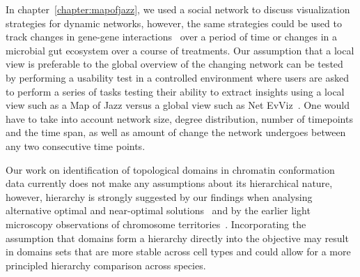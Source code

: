 \documentclass[12pt]{cmuthesis}
\begin{document}
In chapter~\ref{chapter:mapofjazz}, we used a social network to discuss visualization strategies for dynamic networks, however, the same strategies could be used to track changes in gene-gene interactions~\cite{GeneKnockouts} over a period of time or changes in a microbial gut ecosystem over a course of treatments. Our assumption that a local view is preferable to the global overview of the changing network can be tested by performing a usability test in a controlled environment where users are asked to perform a series of tasks testing their ability to extract insights using a local view such as a Map of Jazz versus a global view such as Net EvViz~\cite{Khurana2011}. One would have to take into account network size, degree distribution, number of timepoints and the time span, as well as amount of change the network undergoes between any two consecutive time points.

Our work on identification of topological domains in chromatin conformation data currently does not make any assumptions about its hierarchical nature, however, hierarchy is strongly suggested by our findings when analysing alternative optimal and near-optimal solutions~\cite{ArmatusAMB} and by the earlier light microscopy observations of chromosome territories~\cite{Cremer2010}. Incorporating the assumption that domains form a hierarchy directly into the objective may result in domains sets that are more stable across cell types and could allow for a more principled hierarchy comparison across species.
\end{document}
